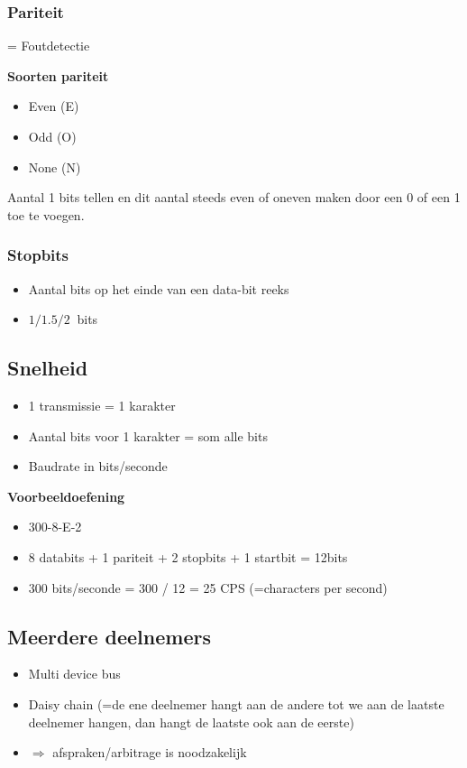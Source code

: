 \documentclass{article}
\newcommand{\bold}[1]{\textbf{#1}}
\begin{document}
\subsubsection{Pariteit}
= Foutdetectie

\bold{Soorten pariteit}
\begin{itemize}
    \item Even (E)
    \item Odd (O)
    \item None (N)
\end{itemize}

Aantal 1 bits tellen en dit aantal steeds even of oneven maken door een 0 of een 1 toe te voegen.

\subsubsection{Stopbits}
\begin{itemize}
    \item Aantal bits op het einde van een data-bit reeks
    \item $1/1.5/2\ $ bits
\end{itemize}

\subsection{Snelheid}
\begin{itemize}
    \item 1 transmissie = 1 karakter
    \item Aantal bits voor 1 karakter = som alle bits
    \item Baudrate in bits/seconde
\end{itemize}

\bold{Voorbeeldoefening}
\begin{itemize}
    \item 300-8-E-2
    \item 8 databits + 1 pariteit + 2 stopbits + 1 startbit = 12bits
    \item 300 bits/seconde = 300 / 12 = 25 CPS (=characters per second)
\end{itemize}

\subsection{Meerdere deelnemers}
\begin{itemize}
    \item Multi device bus
    \item Daisy chain (=de ene deelnemer hangt aan de andere tot we aan de laatste deelnemer hangen, dan hangt de laatste ook aan de eerste)
    \item $\Rightarrow$ afspraken/arbitrage is noodzakelijk
\end{itemize}
\end{document}

